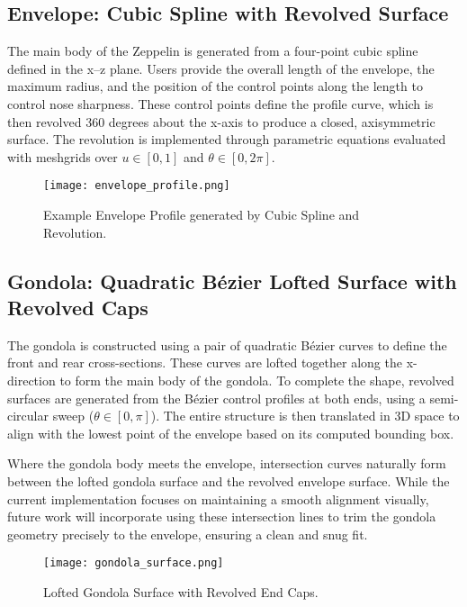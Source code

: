 \documentclass[10pt]{article}
\begin{document}
\subsection{Envelope: Cubic Spline with Revolved Surface}

The main body of the Zeppelin is generated from a four-point cubic spline defined in the x–z plane. Users 
provide the overall length of the envelope, the maximum radius, and the position of the control points along the 
length to control nose sharpness. These control points define the profile curve, which is then revolved 360 
degrees about the x-axis to produce a closed, axisymmetric surface. The revolution is implemented through 
parametric equations evaluated with meshgrids over \( u \in [0, 1] \) and \( \theta \in [0, 2\pi] \).
\begin{figure}[h!]
    \centering
    \texttt{[image: envelope\_profile.png]} %
    \caption{Example Envelope Profile generated by Cubic Spline and Revolution.}
\end{figure}


\subsection{Gondola: Quadratic Bézier Lofted Surface with Revolved Caps}

The gondola is constructed using a pair of quadratic Bézier curves to define the front and rear cross-sections. 
These curves are lofted together along the x-direction to form the main body of the gondola. To complete the 
shape, revolved surfaces are generated from the Bézier control profiles at both ends, using a semi-circular 
sweep (\( \theta \in [0, \pi] \)). The entire structure is then translated in 3D space to align with the lowest 
point of the envelope based on its computed bounding box.
\par
Where the gondola body meets the envelope, intersection curves naturally form between the lofted gondola surface 
and the revolved envelope surface. While the current implementation focuses on maintaining a smooth alignment 
visually, future work will incorporate using these intersection lines to trim the gondola geometry precisely to 
the envelope, ensuring a clean and snug fit.

\begin{figure}[h!]
    \centering
    \texttt{[image: gondola\_surface.png]} %
    \caption{Lofted Gondola Surface with Revolved End Caps.}
\end{figure}
\end{document}
